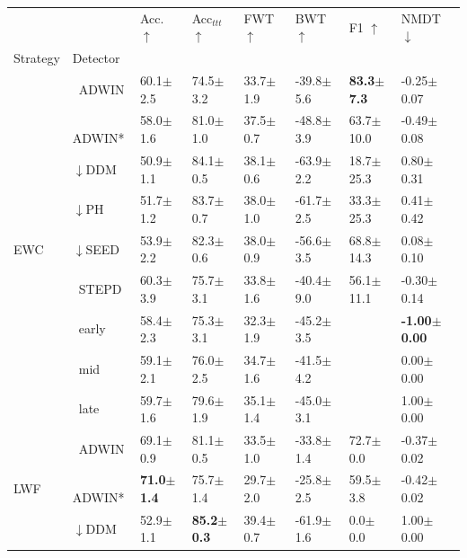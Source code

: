 \begin{tabular}{llllllll}
\toprule
 &  & Acc. $\uparrow$ & Acc$_{ttt}$ $\uparrow$ & FWT $\uparrow$ & BWT $\uparrow$ & F1 $\uparrow$ & NMDT $\downarrow$ \\
Strategy & Detector &  &  &  &  &  &  \\
\midrule
\multirow[t]{9}{*}{EWC} & $\ \;$ADWIN & 60.1\tiny{$\pm$2.5} & 74.5\tiny{$\pm$3.2} & 33.7\tiny{$\pm$1.9} & -39.8\tiny{$\pm$5.6} & \textbf{83.3\tiny{$\pm$7.3}} & -0.25\tiny{$\pm$0.07} \\
 & $\ \;$ADWIN* & 58.0\tiny{$\pm$1.6} & 81.0\tiny{$\pm$1.0} & 37.5\tiny{$\pm$0.7} & -48.8\tiny{$\pm$3.9} & 63.7\tiny{$\pm$10.0} & -0.49\tiny{$\pm$0.08} \\
 & $\downarrow$DDM & 50.9\tiny{$\pm$1.1} & 84.1\tiny{$\pm$0.5} & 38.1\tiny{$\pm$0.6} & -63.9\tiny{$\pm$2.2} & 18.7\tiny{$\pm$25.3} & 0.80\tiny{$\pm$0.31} \\
 & $\downarrow$PH & 51.7\tiny{$\pm$1.2} & 83.7\tiny{$\pm$0.7} & 38.0\tiny{$\pm$1.0} & -61.7\tiny{$\pm$2.5} & 33.3\tiny{$\pm$25.3} & 0.41\tiny{$\pm$0.42} \\
 & $\downarrow$SEED & 53.9\tiny{$\pm$2.2} & 82.3\tiny{$\pm$0.6} & 38.0\tiny{$\pm$0.9} & -56.6\tiny{$\pm$3.5} & 68.8\tiny{$\pm$14.3} & 0.08\tiny{$\pm$0.10} \\
 & $\ \;$STEPD & 60.3\tiny{$\pm$3.9} & 75.7\tiny{$\pm$3.1} & 33.8\tiny{$\pm$1.6} & -40.4\tiny{$\pm$9.0} & 56.1\tiny{$\pm$11.1} & -0.30\tiny{$\pm$0.14} \\
 & $\ \;$early & 58.4\tiny{$\pm$2.3} & 75.3\tiny{$\pm$3.1} & 32.3\tiny{$\pm$1.9} & -45.2\tiny{$\pm$3.5} &  & \textbf{-1.00\tiny{$\pm$0.00}} \\
 & $\ \;$mid & 59.1\tiny{$\pm$2.1} & 76.0\tiny{$\pm$2.5} & 34.7\tiny{$\pm$1.6} & -41.5\tiny{$\pm$4.2} &  & 0.00\tiny{$\pm$0.00} \\
 & $\ \;$late & 59.7\tiny{$\pm$1.6} & 79.6\tiny{$\pm$1.9} & 35.1\tiny{$\pm$1.4} & -45.0\tiny{$\pm$3.1} &  & 1.00\tiny{$\pm$0.00} \\
\midrule
\multirow[t]{9}{*}{LWF} & $\ \;$ADWIN & 69.1\tiny{$\pm$0.9} & 81.1\tiny{$\pm$0.5} & 33.5\tiny{$\pm$1.0} & -33.8\tiny{$\pm$1.4} & 72.7\tiny{$\pm$0.0} & -0.37\tiny{$\pm$0.02} \\
 & $\ \;$ADWIN* & \textbf{71.0\tiny{$\pm$1.4}} & 75.7\tiny{$\pm$1.4} & 29.7\tiny{$\pm$2.0} & -25.8\tiny{$\pm$2.5} & 59.5\tiny{$\pm$3.8} & -0.42\tiny{$\pm$0.02} \\
 & $\downarrow$DDM & 52.9\tiny{$\pm$1.1} & \textbf{85.2\tiny{$\pm$0.3}} & 39.4\tiny{$\pm$0.7} & -61.9\tiny{$\pm$1.6} & 0.0\tiny{$\pm$0.0} & 1.00\tiny{$\pm$0.00} \\

\end{tabular}
